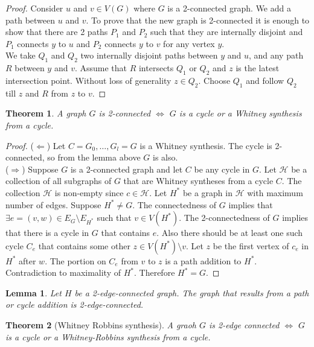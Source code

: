 \documentclass{article}
\newtheorem*{thm}{Theorem}
\newtheorem*{lem}{Lemma}
\theoremstyle{definition}
\begin{document}
\begin{proof}
Consider $u$ and $v\in V(G)$ where $G$ is a 2-connected graph.
We add a path between $u$ and $v$.
To prove that the new graph is 2-connected it is enough to show that there are 2 paths $P_1$ and $P_2$ such that they are internally disjoint and $P_1$ connects $y$ to $u$ and $P_2$ connects $y$ to $v$ for any vertex $y$. \\
We take $Q_1$ and $Q_2$ two internally disjoint paths between $y$ and $u$, and any path $R$ between $y$ and $v$.
Assume that $R$ intersects $Q_1$ or $Q_2$ and $z$ is the latest intersection point.
Without loss of generality $z\in Q_2$.
Choose $Q_1$ and follow $Q_2$ till $z$ and $R$ from $z$ to $v$.
\end{proof}

\begin{thm}
A graph $G$ is 2-connected $\iff$ $G$ is a cycle or a Whitney synthesis from a cycle.
\end{thm}

\begin{proof}
($\Leftarrow$) Let $C=G_0,\ldots,G_l=G$ is a Whitney synthesis.
The cycle is 2-connected, so from the lemma above $G$ is also.\\
($\Rightarrow$) Suppose $G$ is a 2-connected graph and let $C$ be any cycle in $G$.
Let $\mathcal{H}$ be a collection of all subgraphs of $G$ that are Whitney syntheses from a cycle $C$.
The collection $\mathcal{H}$ is non-empty since $c\in\mathcal{H}$.
Let $H^*$ be a graph in $\mathcal{H}$ with maximum number of edges.
Suppose $H^*\ne G$.
The connectedness of $G$ implies that $\exists e=(v,w)\in E_G\setminus E_{H^*}$ such that $v\in V(H^*)$.
The 2-connectedness of $G$ implies that there is a cycle in $G$ that contains $e$.
Also there should be at least one such cycle $C_e$ that contains some other $z\in V(H^*)\setminus v$.
Let $z$ be the first vertex of $c_e$ in $H^*$ after $w$.
The portion on $C_e$ from $v$ to $z$ is a path addition to $H^*$.
Contradiction to maximality of $H^*$.
Therefore $H^* = G$.
\end{proof}

\begin{lem}
Let $H$ be a 2-edge-connected graph.
The graph that results from a path or cycle addition is 2-edge-connected.
\end{lem}

\begin{thm}[Whitney Robbins synthesis]
A graoh $G$ is 2-edge connected $\iff$ $G$ is a cycle or a Whitney-Robbins synthesis from a cycle.
\end{thm}
\end{document}
